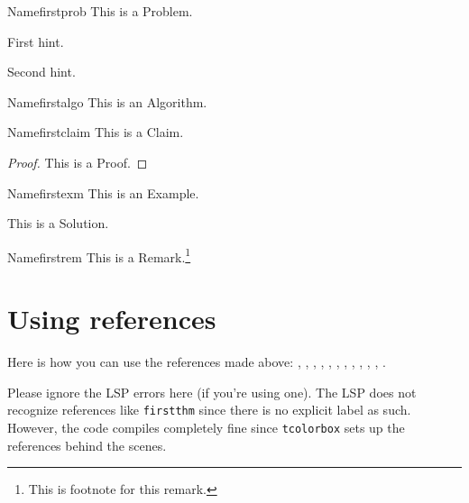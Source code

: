 \documentclass[12pt]{scrartcl}
\begin{document}
\begin{problem}{Name}{firstprob}
  This is a Problem.
\end{problem}
\begin{hints}
  \begin{hint}
    First hint.
  \end{hint}
  \begin{hint}
    Second hint.
  \end{hint}
\end{hints}

\begin{algorithm}{Name}{firstalgo}
  This is an Algorithm.
\end{algorithm}

\begin{claim}{Name}{firstclaim}
  This is a Claim.
\end{claim}

\begin{proof}
  This is a Proof.
\end{proof}

\begin{example}{Name}{firstexm}
  This is an Example.
\end{example}

\begin{soln}
  This is a Solution.
\end{soln}

\hrulebar

\begin{remark}{Name}{firstrem}
  This is a Remark.\footnote{This is footnote for this remark.}
\end{remark}

\section{Using references}

Here is how you can use the references made above:
,
,
,
,
,
,
,
,
,
,
,
.

Please ignore the LSP errors here (if you're using one).
The LSP does not recognize references like \texttt{firstthm}
since there is no explicit label as such. However, the code
compiles completely fine since \texttt{tcolorbox} sets up the
references behind the scenes.
\end{document}
